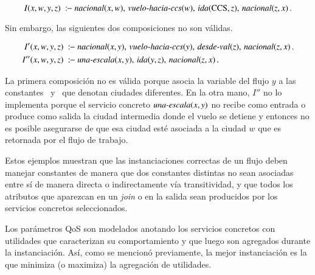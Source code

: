 \[ I(x,w,y,z)\ \qrule\ \nacional(x,w),\,\vueloCCS(w),\,\ida(\PA,z),\,\nacional(z,x)\,. \]

Sin embargo, las siguientes dos composiciones no son válidas.

\begin{alignat*}{1}
I'(x,w,y,z)\  \qrule\ &\nacional(x,y),\,\vueloCCS(y),\,\desdeVAL(z),\,\nacional(z,x)\,. \\
I''(x,w,y,z)\ \qrule\ &\unaescala(x,y),\,\ida(y,z),\,\nacional(z,x)\,.
\end{alignat*}

La primera composición no es válida porque asocia la variable del flujo $y$ a
las constantes \PA\ y \NY\ que denotan ciudades diferentes. En la otra mano, $I''$
no lo implementa porque el servicio concreto $\text{\it una-escala}(x,y)$ no recibe como entrada
o produce como salida la ciudad intermedia donde el vuelo se detiene y entonces
no es posible asegurarse de que esa ciudad esté asociada a la ciudad $w$ que es
retornada por el flujo de trabajo.

Estos ejemplos muestran que las instanciaciones correctas de un flujo deben
manejar constantes de manera que dos constantes distintas no sean asociadas
entre sí de manera directa o indirectamente vía transitividad, y que todos los
atributos que aparezcan en un \emph{join} o en la salida sean producidos por los
servicios concretos seleccionados.

Los parámetros QoS son modelados anotando los servicios concretos con utilidades
que caracterizan su comportamiento y que luego son agregados durante la
instanciación. Así, como se mencionó previamente, la mejor instanciación es la
que minimiza (o maximiza) la agregación de utilidades.
